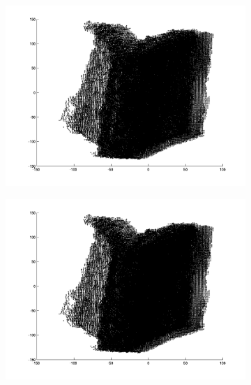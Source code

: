 \begin{figure}
	\begin{subfigure}[b]{0.3\textwidth}
		\centering
		\includegraphics[width=\textwidth]{Images/Book7.png}
		\caption{}
	\end{subfigure}%
	\begin{subfigure}[b]{0.3\textwidth}
		\centering
		\includegraphics[width=\textwidth]{Images/Book8.png}
		\caption{}
	\end{subfigure}
	\begin{subfigure}[b]{0.3\textwidth}
		\centering

\end{subfigure}
\end{figure}
